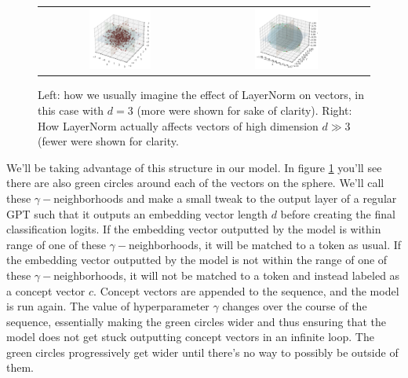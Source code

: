 \documentclass{article}
\begin{document}
\begin{figure}[!htb]
    \centering
    \begin{tabular}{cc}
       \includegraphics[width=0.4\textwidth]{layernorm_vectors.png}  &  \includegraphics[width=0.4\textwidth]{gamma-neighborhoods.png}
    \end{tabular}
    
    \caption{Left: how we usually imagine the effect of LayerNorm on vectors, in this case with $d=3$ (more were shown for sake of clarity). 
    Right: How LayerNorm actually affects vectors of high dimension $d\gg 3$ (fewer were shown for clarity.}
    \label{fig:vectors}
\end{figure}

We'll be taking advantage of this structure in our model.
In figure \ref{fig:vectors} you'll see there are also green circles around each of the vectors on the sphere.
We'll call these $\gamma-$neighborhoods and make a small tweak to the output layer of a regular GPT such that it outputs an embedding vector length $d$ before creating the final classification logits.
If the embedding vector outputted by the model is within range of one of these $\gamma-$neighborhoods, it will be matched to a token as usual.
If the embedding vector outputted by the model is not within the range of one of these $\gamma-$neighborhoods, it will not be matched to a token and instead labeled as a concept vector $c$.
Concept vectors are appended to the sequence, and the model is run again. 
The value of hyperparameter $\gamma$ changes over the course of the sequence, essentially making the green circles wider and thus ensuring that the model does not get stuck outputting concept vectors in an infinite loop.
The green circles progressively get wider until there's no way to possibly be outside of them.\par
\end{document}
